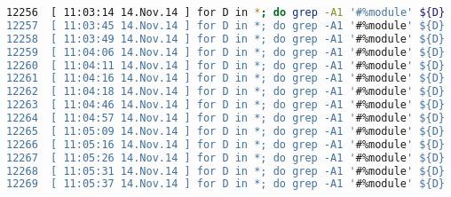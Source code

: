\begin{fullwidth}
\begin{lstlisting}[basicstyle={\tiny\ttfamily},language=bash,tabsize=4]
12256  [ 11:03:14 14.Nov.14 ] for D in *; do grep -A1 '#%module' ${D} | sed 's/#%module\n'//g'; done
12257  [ 11:03:45 14.Nov.14 ] for D in *; do grep -A1 '#%module' ${D} | sed 's/module\n//g'; done
12258  [ 11:03:49 14.Nov.14 ] for D in *; do grep -A1 '#%module' ${D} | sed 's/module//g'; done
12259  [ 11:04:06 14.Nov.14 ] for D in *; do grep -A1 '#%module' ${D} | sed 's/#%module\n//g'; done
12260  [ 11:04:11 14.Nov.14 ] for D in *; do grep -A1 '#%module' ${D} | sed 's/#%module\\n//g'; done
12261  [ 11:04:16 14.Nov.14 ] for D in *; do grep -A1 '#%module' ${D} | sed 's/#%module //g'; done
12262  [ 11:04:18 14.Nov.14 ] for D in *; do grep -A1 '#%module' ${D} | sed 's/#%module//g'; done
12263  [ 11:04:46 14.Nov.14 ] for D in *; do grep -A1 '#%module' ${D} | sed 's/#%module//g' |sed 's/#% description//g'; done
12264  [ 11:04:57 14.Nov.14 ] for D in *; do grep -A1 '#%module' ${D} | sed 's/#%module//g' |sed 's/#% description: \n//g'; done
12265  [ 11:05:09 14.Nov.14 ] for D in *; do grep -A1 '#%module' ${D} | sed 's/#%module//g' |sed 's/#% description: //g' |cut -d "\n"; done
12266  [ 11:05:16 14.Nov.14 ] for D in *; do grep -A1 '#%module' ${D} | sed 's/#%module//g' |sed 's/#% description: //g' |tr -d "\n"; done
12267  [ 11:05:26 14.Nov.14 ] for D in *; do grep -A1 '#%module' ${D} | sed 's/#%module//g' |sed 's/#% description: //g' |tr "\n" ""; done
12268  [ 11:05:31 14.Nov.14 ] for D in *; do grep -A1 '#%module' ${D} | sed 's/#%module//g' |sed 's/#% description: //g' |tr "\n" " "; done
12269  [ 11:05:37 14.Nov.14 ] for D in *; do grep -A1 '#%module' ${D} | sed 's/#%module//g' |sed 's/#% description: //g'; done


\end{lstlisting}
\end{fullwidth}
